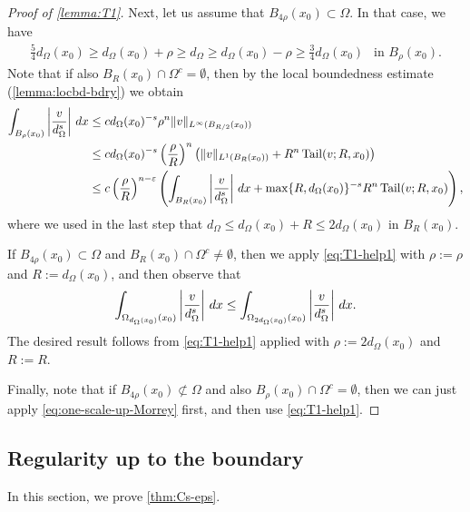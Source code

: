 \documentclass[11pt,reqno]{amsart}
\theoremstyle{plain}
\theoremstyle{definition}
\numberwithin{equation}{section}
\newcommand{\1}{\mathbbm{1}}
\DeclareMathOperator{\tail}{Tail}
\renewcommand{\d}{\textnormal{\,d}}
\begin{document}
\begin{proof}[Proof of \autoref{lemma:T1}]
Next, let us assume that $B_{4\rho}(x_0) \subset \Omega$. In that case, we have
\begin{align*}
\frac{5}{4} d_{\Omega}(x_0) \ge d_{\Omega}(x_0) + \rho \ge d_{\Omega} \ge d_{\Omega}(x_0) - \rho \ge \frac{3}{4} d_{\Omega}(x_0) ~~ \text{ in } B_{\rho}(x_0).
\end{align*}
Note that if also $B_R(x_0) \cap \Omega^c = \emptyset$, then by the local boundedness estimate (\autoref{lemma:locbd-bdry}) we obtain
\begin{align}
\label{eq:T1-help3}
\begin{split}
\int_{B_{\rho}(x_0)} \left|\frac{v}{d_{\Omega}^s} \right| \d x
&\le c d_{\Omega}(x_0)^{-s} \rho^{n} \Vert v \Vert_{L^{\infty}(B_{R/2}(x_0))} \\
&\le c d_{\Omega}(x_0)^{-s} \left( \frac{\rho}{R} \right)^n \left( \|v\|_{L^1(B_R(x_0))} + R^n \tail(v; R,x_0) \right) \\
&\leq c \left( \frac{\rho}{R} \right)^{n-\varepsilon} \left( \int_{B_{R}(x_0)} \left| \frac{v}{d_{\Omega}^s} \right| \d x + \max\{R,d_{\Omega}(x_0)\}^{-s} R^{n} \tail(v; R,x_0) \right),
\end{split}
\end{align}
where we used in the last step that $d_{\Omega} \le d_{\Omega}(x_0) + R \le 2 d_{\Omega}(x_0)$ in $B_R(x_0)$.

If $B_{4\rho}(x_0) \subset \Omega$ and $B_R(x_0) \cap \Omega^c \not=\emptyset$, then we apply \eqref{eq:T1-help1} with $\rho := \rho$ and $R := d_{\Omega}(x_0)$, and then observe that
\begin{align}
\label{eq:one-scale-up-Morrey}
\int_{\Omega_{d_{\Omega}(x_0)}(x_0)} \left|\frac{v}{d_{\Omega}^s} \right| \d x\le \int_{\Omega_{2d_{\Omega}(x_0)}(x_0)} \left|\frac{v}{d_{\Omega}^s} \right| \d x.
\end{align}
The desired result follows from \eqref{eq:T1-help1} applied with $\rho := 2 d_{\Omega}(x_0)$ and $R := R$.

Finally, note that if $B_{4\rho}(x_0) \not\subset \Omega$ and also $B_{\rho}(x_0) \cap \Omega^c = \emptyset$, then we can just apply \eqref{eq:one-scale-up-Morrey} first, and then use \eqref{eq:T1-help1}.
\end{proof}


\subsection{Regularity up to the boundary}

In this section, we prove \autoref{thm:Cs-eps}.
\end{document}
